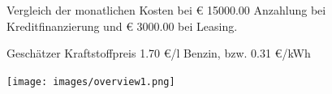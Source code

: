 \documentclass[landscape, DIV=99, 14pt]{scrartcl}
\begin{document}
\pagebreak



\pagebreak

\onecolumn
\begin{figure}
\centering
Vergleich der monatlichen Kosten bei \euro{} 15000.00 Anzahlung bei Kreditfinanzierung und \euro{} 3000.00 bei Leasing.

Gesch\"atzer Kraftstoffpreis 1.70 \euro{}/l Benzin, bzw. 0.31 \euro{}/kWh


\texttt{[image: images/overview1.png]}
\end{figure}
\vfill 
\end{document}
